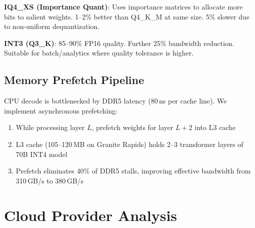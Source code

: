 \documentclass[conference,10pt]{IEEEtran}
\begin{document}
\textbf{IQ4\_XS (Importance Quant)}: Uses importance matrices to allocate more bits to salient weights. 1--2\% better than Q4\_K\_M at same size. 5\% slower due to non-uniform dequantization.

\textbf{INT3 (Q3\_K)}: 85--90\% FP16 quality. Further 25\% bandwidth reduction. Suitable for batch/analytics where quality tolerance is higher.

\subsection{Memory Prefetch Pipeline}

CPU decode is bottlenecked by DDR5 latency (80\,ns per cache line). We implement asynchronous prefetching:

\begin{enumerate}
\item While processing layer $L$, prefetch weights for layer $L+2$ into L3 cache
\item L3 cache (105--120\,MB on Granite Rapids) holds 2--3 transformer layers of 70B INT4 model
\item Prefetch eliminates 40\% of DDR5 stalls, improving effective bandwidth from 310\,GB/s to 380\,GB/s
\end{enumerate}

\section{Cloud Provider Analysis}
\label{sec:cloud}
\end{document}
